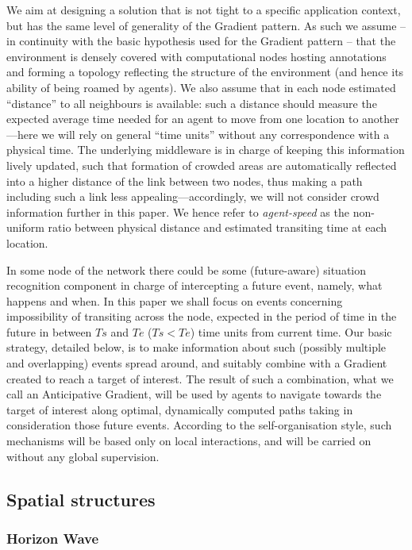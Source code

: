 \documentclass[12pt,a4paper,twoside,openright]{book}
\begin{document}
We aim at designing a solution that is not tight to a specific application context, but has the same level of generality of the Gradient pattern.
%
As such we assume -- in continuity with the basic hypothesis used for the Gradient pattern -- that the environment is densely covered with computational nodes hosting annotations and forming a topology reflecting the structure of the environment (and hence its ability of being roamed by agents).
%
We also assume that in each node estimated ``distance'' to all neighbours is available: such a distance should measure the expected average time needed for an agent to move from one location to another---here we will rely on general ``time units'' without any correspondence with a physical time.
%
The underlying middleware is in charge of keeping this information lively updated, such that formation of crowded areas are automatically reflected into a higher distance of the link between two nodes, thus making a path including such a link less appealing---accordingly, we will not consider crowd information further in this paper.
%
We hence refer to \emph{agent-speed} as the non-uniform ratio between physical distance and estimated transiting time at each location.

In some node of the network there could be some (future-aware) situation recognition component \cite{YeDM12} in charge of intercepting a future event, namely, what happens and when.
%
In this paper we shall focus on events concerning impossibility of transiting across the node, expected in the period of time in the future in between $Ts$ and $Te$ ($Ts<Te$) time units from current time.
%
Our basic strategy, detailed below, is to make information about such (possibly multiple and overlapping) events spread around, and suitably combine with a Gradient created to reach a target of interest.
%
The result of such a combination, what we call an Anticipative Gradient, will be used by agents to navigate towards the target of interest along optimal, dynamically computed paths taking in consideration those future events.
%
According to the self-organisation style, such mechanisms will be based only on local interactions, and will be carried on without any global supervision.

\subsection{Spatial structures}

\subsubsection{Horizon Wave}
\end{document}
